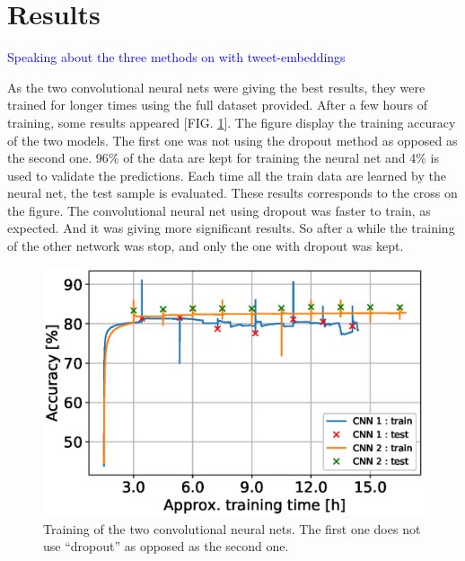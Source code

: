 \section{Results}
\textcolor{blue}{Speaking about the three methods on with tweet-embeddings}

As the two convolutional neural nets were giving the best results, they were trained for longer times using the full dataset provided. After a few hours of training, some results appeared [FIG. \ref{plot:CNNaccuracy}]. The figure display the training accuracy of the two models. The first one was not using the dropout method as opposed as the second one. 96\% of the data are kept for training the neural net and 4\% is used to validate the predictions. Each time all the train data are learned by the neural net, the test sample is evaluated. These results corresponds to the cross on the figure. The convolutional neural net using dropout was faster to train, as expected. And it was giving more significant results. So after a while the training of the other network was stop, and only the one with dropout was kept. 

\label{sec:results}
\begin{figure}[h!]
\centering
	\includegraphics[scale=0.6]{CNNaccuracy} 
\caption{Training of the two convolutional neural nets. The first one does not use ``dropout'' as opposed as the second one.}
\label{plot:CNNaccuracy}
\end{figure}
\FloatBarrier


